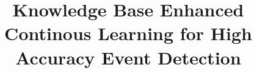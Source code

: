\documentclass[conference,compsoc]{IEEEtran}
\begin{document}

\title{Knowledge Base Enhanced Continous Learning for High Accuracy Event Detection}

\end{document}
